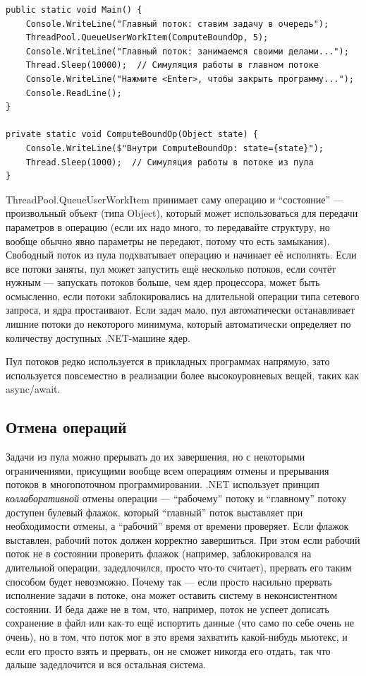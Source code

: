 \documentclass[a5paper]{article}
\begin{document}
\begin{verbatim}
public static void Main() {
    Console.WriteLine("Главный поток: ставим задачу в очередь");
    ThreadPool.QueueUserWorkItem(ComputeBoundOp, 5);
    Console.WriteLine("Главный поток: занимаемся своими делами...");
    Thread.Sleep(10000);  // Симуляция работы в главном потоке
    Console.WriteLine("Нажмите <Enter>, чтобы закрыть программу...");
    Console.ReadLine();
}

private static void ComputeBoundOp(Object state) {
    Console.WriteLine($"Внутри ComputeBoundOp: state={state}");
    Thread.Sleep(1000);  // Симуляция работы в потоке из пула
}
\end{verbatim}

ThreadPool.QueueUserWorkItem принимает саму операцию и ``состояние'' --- произвольный объект (типа Object), который может использоваться для передачи параметров в операцию (если их надо много, то передавайте структуру, но вообще обычно явно параметры не передают, потому что есть замыкания). Свободный поток из пула подхватывает операцию и начинает её исполнять. Если все потоки заняты, пул может запустить ещё несколько потоков, если сочтёт нужным --- запускать потоков больше, чем ядер процессора, может быть осмысленно, если потоки заблокировались на длительной операции типа сетевого запроса, и ядра простаивают. Если задач мало, пул автоматически останавливает лишние потоки до некоторого минимума, который автоматически определяет по количеству доступных .NET-машине ядер.

Пул потоков редко используется в прикладных программах напрямую, зато используется повсеместно в реализации более высокоуровневых вещей, таких как async/await.

\subsection{Отмена операций}

Задачи из пула можно прерывать до их завершения, но с некоторыми ограничениями, присущими вообще всем операциям отмены и прерывания потоков в многопоточном программировании. .NET использует принцип \textit{коллаборативной} отмены операции --- ``рабочему'' потоку и ``главному'' потоку доступен булевый флажок, который ``главный'' поток выставляет при необходимости отмены, а ``рабочий'' время от времени проверяет. Если флажок выставлен, рабочий поток должен корректно завершиться. При этом если рабочий поток не в состоянии проверить флажок (например, заблокировался на длительной операции, задедлочился, просто что-то считает), прервать его таким способом будет невозможно. Почему так --- если просто насильно прервать исполнение задачи в потоке, она может оставить систему в неконсистентном состоянии. И беда даже не в том, что, например, поток не успеет дописать сохранение в файл или как-то ещё испортить данные (что само по себе очень не очень), но в том, что поток мог в это время захватить какой-нибудь мьютекс, и если его просто взять и прервать, он не сможет никогда его отдать, так что дальше задедлочится и вся остальная система. 
\end{document}
